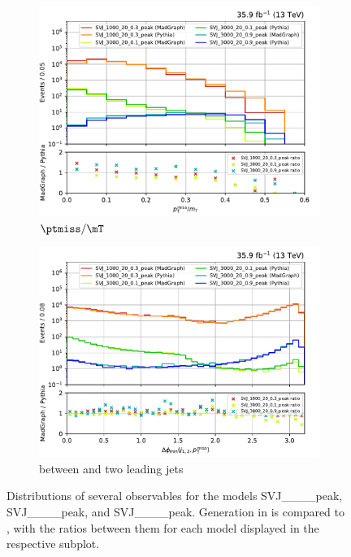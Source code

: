 \begin{figure}[htbp]
    \begin{subfigure}[b]{0.48\textwidth}
        \includegraphics[width=\textwidth]{figures/madgraph_pythia_comparisons/plots/part1/met_over_mt.pdf}
        \caption{$\ptmiss/\mT$}
    \end{subfigure}
    \hfill
    \begin{subfigure}[b]{0.48\textwidth}
        \includegraphics[width=\textwidth]{figures/madgraph_pythia_comparisons/plots/part1/min_dphi.pdf}
        \caption{\mindphi between \ptmiss and two leading \glspl{jet}}
    \end{subfigure}
    \caption[Distributions of several observables for the models SVJ\_\_\_\_\-peak, SVJ\_\_\_\_\-peak, and SVJ\_\_\_\_\-peak]{Distributions of several observables for the models SVJ\_\_\_\_\-peak, SVJ\_\_\_\_\-peak, and SVJ\_\_\_\_\-peak. Generation in \MGvATNLO is compared to \PYTHIAEIGHT, with the ratios between them for each model displayed in the respective subplot.}
    \label{fig:svj_mg_pythia_comparison_set1}
\end{figure}

